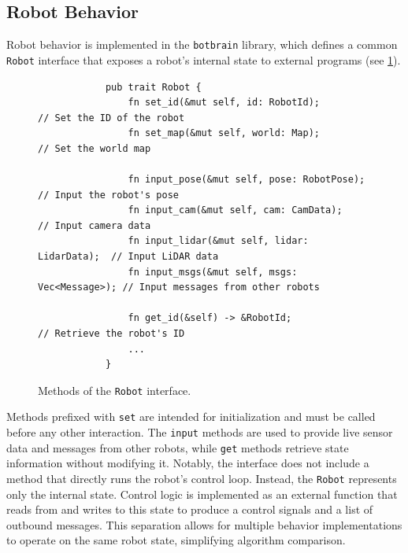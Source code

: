 \subsection{Robot Behavior}
Robot behavior is implemented in the \texttt{botbrain} library, which defines a common \texttt{Robot} interface that exposes a robot’s internal state to external programs (see \cref{fig:robot-interface}).

\begin{figure}[H]
    \begin{center}
        \begin{verbatim}
            pub trait Robot {
                fn set_id(&mut self, id: RobotId);            // Set the ID of the robot
                fn set_map(&mut self, world: Map);            // Set the world map

                fn input_pose(&mut self, pose: RobotPose);    // Input the robot's pose
                fn input_cam(&mut self, cam: CamData);        // Input camera data
                fn input_lidar(&mut self, lidar: LidarData);  // Input LiDAR data
                fn input_msgs(&mut self, msgs: Vec<Message>); // Input messages from other robots

                fn get_id(&self) -> &RobotId;                 // Retrieve the robot's ID
                ...
            }
        \end{verbatim}
    \end{center}
    \caption{Methods of the \texttt{Robot} interface.}
    \label{fig:robot-interface}
\end{figure}

Methods prefixed with \texttt{set} are intended for initialization and must be called before any other interaction. The \texttt{input} methods are used to provide live sensor data and messages from other robots, while \texttt{get} methods retrieve state information without modifying it. Notably, the interface does not include a method that directly runs the robot’s control loop. Instead, the \texttt{Robot} represents only the internal state. Control logic is implemented as an external function that reads from and writes to this state to produce a control signals and a list of outbound messages. This separation allows for multiple behavior implementations to operate on the same robot state, simplifying algorithm comparison.

